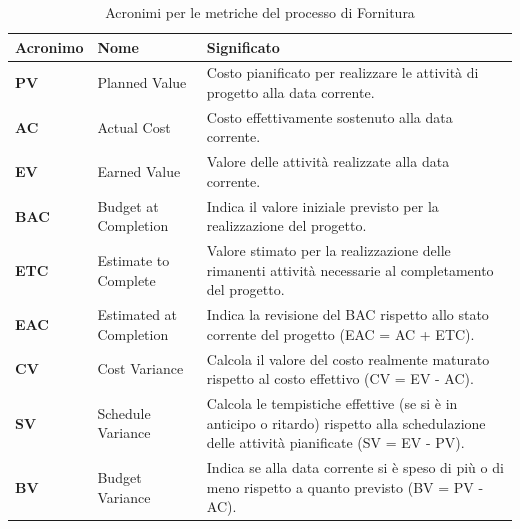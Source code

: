 \begin{table}[h!]
\centering
\def\arraystretch{1.5}
\begin{tabular}{ |m{2cm}|m{4cm}|m{8cm}| }
\hline
\rowcolor{lightgray!30}
\textbf{Acronimo} & \textbf{Nome} & \textbf{Significato}\\
\hline
\textbf{PV} & Planned Value & Costo pianificato per realizzare le attività di progetto alla data corrente.\\
\hline
\textbf{AC} & Actual Cost & Costo effettivamente sostenuto alla data corrente.\\
\hline
\textbf{EV} & Earned Value & Valore delle attività realizzate alla data corrente.\\
\hline
\textbf{BAC} & Budget at Completion & Indica il valore iniziale previsto per la realizzazione del progetto.\\
\hline
\textbf{ETC} & Estimate to Complete & Valore stimato per la realizzazione delle rimanenti attività necessarie al completamento del progetto.\\
\hline
\textbf{EAC} & Estimated at Completion & Indica la revisione del BAC rispetto allo stato corrente del progetto (EAC = AC + ETC).\\
\hline
\textbf{CV} & Cost Variance & Calcola il valore del costo realmente maturato rispetto al costo effettivo (CV = EV - AC).\\
\hline
\textbf{SV} & Schedule Variance & Calcola le tempistiche effettive (se si è in anticipo o ritardo) rispetto alla schedulazione delle attività pianificate (SV = EV - PV).\\
\hline
\textbf{BV} & Budget Variance & Indica se alla data corrente si è speso di più o di meno rispetto a quanto previsto (BV = PV - AC).\\
\hline

\end{tabular}
\caption{Acronimi per le metriche del processo di Fornitura}
\end{table}


